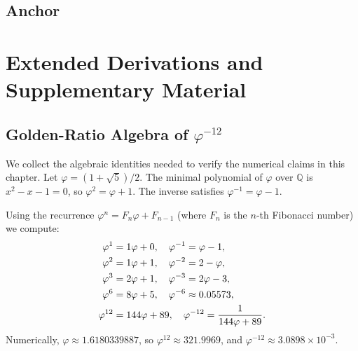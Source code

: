 \subsection{Anchor}
\label{subsec:anchor}

\medskip
\noindent\anchorline{}


\section{Extended Derivations and Supplementary Material}
\label{sec:extended}

\subsection{Golden-Ratio Algebra of \texorpdfstring{$\varphi^{-12}$}{phi^{-12}}}
\label{subsec:phi12-algebra}

We collect the algebraic identities needed to verify the numerical
claims in this chapter.  Let $\varphi = (1+\sqrt{5})/2$.
The minimal polynomial of $\varphi$ over $\mathbb{Q}$ is
$x^{2} - x - 1 = 0$, so $\varphi^{2} = \varphi + 1$.
The inverse satisfies $\varphi^{-1} = \varphi - 1$.

Using the recurrence $\varphi^{n} = F_{n}\varphi + F_{n-1}$
(where $F_{n}$ is the $n$-th Fibonacci number) we compute:
\begin{align}
  \varphi^{1}  &= 1\varphi + 0,
  \quad \varphi^{-1} = \varphi - 1, \notag\\
  \varphi^{2}  &= 1\varphi + 1,
  \quad \varphi^{-2} = 2 - \varphi, \notag\\
  \varphi^{3}  &= 2\varphi + 1,
  \quad \varphi^{-3} = 2\varphi - 3, \notag\\
  \varphi^{6}  &= 8\varphi + 5,
  \quad \varphi^{-6} \approx 0.05573, \notag\\
  \varphi^{12} &= 144\varphi + 89,
  \quad \varphi^{-12} = \frac{1}{144\varphi+89}. \label{eq:phi12}
\end{align}
Numerically, $\varphi \approx 1.6180339887$, so
$\varphi^{12} \approx 321.9969$, and
$\varphi^{-12} \approx 3.0898 \times 10^{-3}$.

